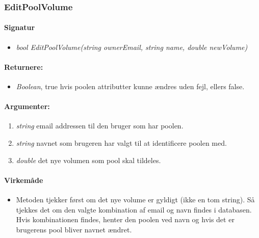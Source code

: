 \subsubsection{EditPoolVolume}%







\paragraph{Signatur}
\begin{itemize}
	\item \textit{bool EditPoolVolume(string ownerEmail, string name, double newVolume)}
\end{itemize}

\paragraph{Returnere:}
\begin{itemize}
	\item \textit{Boolean}, true hvis poolen attributter kunne ændres uden fejl, ellers false.
\end{itemize}

\paragraph{Argumenter:}
\begin{enumerate}
	\item \textit{string} email addressen til den bruger som har poolen.
	\item \textit{string} navnet som brugeren har valgt til at identificere poolen med.
	\item \textit{double} det nye volumen som pool skal tildeles.
\end{enumerate}

\paragraph{Virkemåde}
\begin{itemize}
	\item Metoden tjekker først om det nye volume er gyldigt (ikke en tom string). Så tjekkes det om den valgte kombination af email og navn findes i databasen. Hvis kombinationen findes, henter den poolen ved navn og hvis det er brugerens pool bliver navnet ændret.
\end{itemize}





